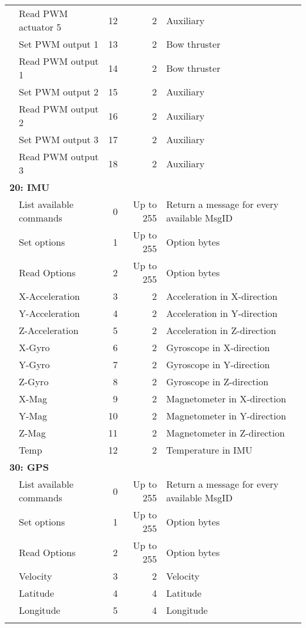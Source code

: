 \begin{table}[h]
\begin{tabular}{llrrl}
	& Read PWM actuator 5 & 12 & 2 & Auxiliary\\ 
	& Set PWM output 1 & 13 & 2 & Bow thruster\\
	& Read PWM output 1 & 14 & 2 & Bow thruster\\ 
	& Set PWM output 2 & 15 & 2 & Auxiliary\\
	& Read PWM output 2 & 16 & 2 & Auxiliary\\ 
	& Set PWM output 3 & 17 & 2 & Auxiliary\\
	& Read PWM output 3 & 18 & 2 & Auxiliary\\ 
	\midrule
	\multicolumn{5}{l}{\textbf{20: IMU}}\\
	\midrule
	& List available commands & 0 & Up to 255 & Return a message for every available MsgID\\
	& Set options & 1 & Up to 255 & Option bytes\\
	& Read Options & 2 & Up to 255 & Option bytes\\
	& X-Acceleration & 3 & 2 & Acceleration in X-direction\\
	& Y-Acceleration & 4 & 2 & Acceleration in Y-direction\\
	& Z-Acceleration & 5 & 2 & Acceleration in Z-direction\\
	& X-Gyro & 6 & 2 & Gyroscope in X-direction\\
	& Y-Gyro & 7 & 2 & Gyroscope in Y-direction\\
	& Z-Gyro & 8 & 2 & Gyroscope in Z-direction\\
	& X-Mag & 9 & 2 & Magnetometer in X-direction\\
	& Y-Mag & 10 & 2 & Magnetometer in Y-direction\\
	& Z-Mag & 11 & 2 & Magnetometer in Z-direction\\
	& Temp & 12 & 2 & Temperature in IMU\\
	\midrule
	\multicolumn{5}{l}{\textbf{30: GPS}}\\
	\midrule
	& List available commands & 0 & Up to 255 & Return a message for every available MsgID\\
	& Set options & 1 & Up to 255 & Option bytes\\
	& Read Options & 2 & Up to 255 & Option bytes\\
	& Velocity & 3 & 2 & Velocity\\
	& Latitude & 4 & 4 & Latitude\\
	& Longitude & 5 & 4 & Longitude\\
	\label{Tablesofcommands}
	\end{tabular}
\end{table}

